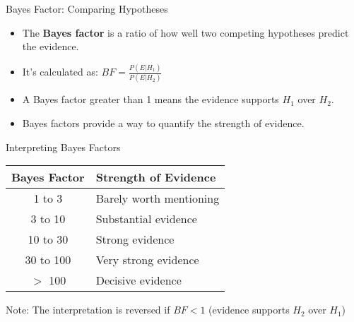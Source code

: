 \documentclass{beamer}
\begin{document}
	\begin{frame}{Bayes Factor: Comparing Hypotheses}
		\begin{itemize}
			\item The \textbf{Bayes factor} is a ratio of how well two competing hypotheses predict the evidence.
			\item It's calculated as: $BF = \frac{P(E|H_1)}{P(E|H_2)}$
			\item A Bayes factor greater than 1 means the evidence supports $H_1$ over $H_2$.
			\item Bayes factors provide a way to quantify the strength of evidence.
		\end{itemize}
		
		\begin{block}{Interpreting Bayes Factors}
			\begin{center}
				\begin{tabular}{|c|l|}
					\hline
					\textbf{Bayes Factor} & \textbf{Strength of Evidence} \\
					\hline
					1 to 3 & Barely worth mentioning \\
					3 to 10 & Substantial evidence \\
					10 to 30 & Strong evidence \\
					30 to 100 & Very strong evidence \\
					$>$ 100 & Decisive evidence \\
					\hline
				\end{tabular}
			\end{center}
			
			Note: The interpretation is reversed if $BF < 1$ (evidence supports $H_2$ over $H_1$)
		\end{block}
	\end{frame}
	
\end{document}
